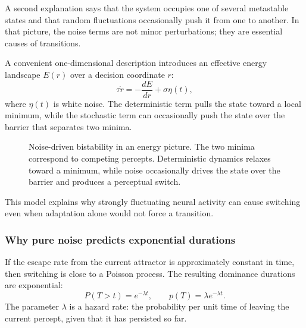 A second explanation says that the system occupies one of several metastable states and that random fluctuations occasionally push it from one to another. In that picture, the noise terms are not minor perturbations; they are essential causes of transitions.

A convenient one-dimensional description introduces an effective energy landscape \(E(r)\) over a decision coordinate \(r\):
\[
\tau \dot r = -\frac{dE}{dr} + \sigma \eta(t),
\]
where \(\eta(t)\) is white noise. The deterministic term pulls the state toward a local minimum, while the stochastic term can occasionally push the state over the barrier that separates two minima.

\begin{figure}[!htbp]
\centering
{}
\caption{Noise-driven bistability in an energy picture. The two minima correspond to competing percepts. Deterministic dynamics relaxes toward a minimum, while noise occasionally drives the state over the barrier and produces a perceptual switch.}
\end{figure}

This model explains why strongly fluctuating neural activity can cause switching even when adaptation alone would not force a transition.

\subsubsection{Why pure noise predicts exponential durations}

If the escape rate from the current attractor is approximately constant in time, then switching is close to a Poisson process. The resulting dominance durations are exponential:
\[
P(T>t)=e^{-\lambda t},
\qquad
p(T)=\lambda e^{-\lambda t}.
\]
The parameter \(\lambda\) is a hazard rate: the probability per unit time of leaving the current percept, given that it has persisted so far.

